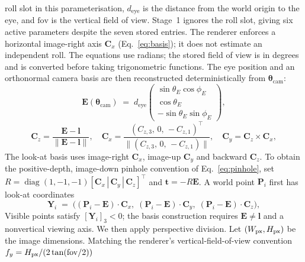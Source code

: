 roll slot in this parameterisation, $d_{\mathrm{eye}}$ is the distance from the world origin to the eye, and
$\mathrm{fov}$ is the vertical field of view. Stage~1 ignores the roll slot, giving six active parameters despite
the seven stored entries. The renderer enforces a
horizontal image-right axis $\mathbf C_x$ (Eq.~\eqref{eq:basis});
it does not estimate an independent roll. The equations use radians;
the stored field of view is in degrees and is converted before taking
trigonometric functions. The eye position and an orthonormal camera
basis are then reconstructed deterministically from
$\boldsymbol{\theta}_{\mathrm{cam}}$:
\begin{equation}
\label{eq:eye}
    \mathbf{E}(\boldsymbol{\theta}_{\mathrm{cam}})
    \;=\; d_{\mathrm{eye}}
    \begin{pmatrix}
        \sin\theta_{E}\cos\phi_{E} \\
        \cos\theta_{E} \\
        -\sin\theta_{E}\sin\phi_{E}
    \end{pmatrix},
\end{equation}
\begin{equation}
\label{eq:basis}
    \mathbf{C}_{z} = \frac{\mathbf{E} - \mathbf{l}}
                           {\|\mathbf{E} - \mathbf{l}\|},
    \quad
    \mathbf{C}_{x} = \frac{(C_{z,3},\,0,\,-C_{z,1})^{\!\top}}
                           {\|(C_{z,3},\,0,\,-C_{z,1})\|},
    \quad
    \mathbf{C}_{y} = \mathbf{C}_{z} \times \mathbf{C}_{x},
\end{equation}
The look-at basis uses image-right $\mathbf C_x$, image-up
$\mathbf C_y$ and backward $\mathbf C_z$. To obtain the positive-depth,
image-down pinhole convention of Eq.~\eqref{eq:pinhole}, set
$R=\operatorname{diag}(1,-1,-1)
[\mathbf C_x\,|\,\mathbf C_y\,|\,\mathbf C_z]^\top$ and
$\mathbf t=-R\mathbf E$. A world point $\mathbf P_i$ first has
look-at coordinates
\begin{equation}
\label{eq:screen}
    \mathbf{Y}_{i}
    \;=\;
    \bigl(
      (\mathbf{P}_{i} - \mathbf{E})\!\cdot\!\mathbf{C}_{x},\;
      (\mathbf{P}_{i} - \mathbf{E})\!\cdot\!\mathbf{C}_{y},\;
      (\mathbf{P}_{i} - \mathbf{E})\!\cdot\!\mathbf{C}_{z}
    \bigr),
\end{equation}
Visible points satisfy $[\mathbf Y_i]_3<0$; the basis construction
requires $\mathbf E\ne\mathbf l$ and a nonvertical viewing axis.
We then apply perspective division. Let
$(W_{\rm px},H_{\rm px})$ be the image dimensions. Matching the renderer's
vertical-field-of-view convention
$f_{y}=H_{\rm px}/(2\tan(\mathrm{fov}/2))$
